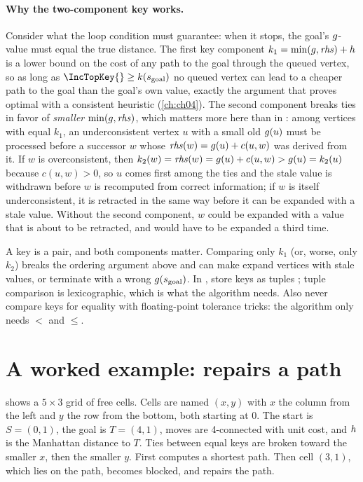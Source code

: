 \paragraph{Why the two-component key works.}
Consider what the loop condition must guarantee: when it stops, the goal's
$g$-value must equal the true distance. The first key component
$k_1 = \min(g,\mathit{rhs}) + h$ is a lower bound on the cost of any path to the goal
through the queued vertex, so as long as $\IncTopKey{} \ge k(s_{\mathrm{goal}})$ no
queued vertex can lead to a cheaper path to the goal than the goal's own value, exactly
the argument that proves \astar optimal with a consistent heuristic (\cref{ch:ch04}).
The second component breaks ties in favor of \emph{smaller} $\min(g,\mathit{rhs})$, which
matters more here than in \astar: among vertices with equal $k_1$, an underconsistent
vertex $u$ with a small old $g(u)$ must be processed before a successor $w$ whose
$\mathit{rhs}(w)=g(u)+c(u,w)$ was derived from it. If $w$ is overconsistent, then
$k_2(w)=\mathit{rhs}(w)=g(u)+c(u,w) > g(u) = k_2(u)$ because $c(u,w)>0$, so $u$ comes
first among the ties and the stale value is withdrawn before $w$ is recomputed from
correct information; if $w$ is itself underconsistent, it is retracted in the same way
before it can be expanded with a stale value. Without the second component, $w$ could be expanded with a
value that is about to be retracted, and would have to be expanded a third time.

\begin{pitfall}
A key is a pair, and both components matter. Comparing only $k_1$ (or, worse, only
$k_2$) breaks the ordering argument above and can make \lpastar expand vertices with
stale values, or terminate with a wrong $g(s_{\mathrm{goal}})$. In \python, store
keys as tuples ; tuple comparison is lexicographic, which is what the
algorithm needs. Also never compare keys for equality with floating-point tolerance
tricks: the algorithm only needs $<$ and $\le$.
\end{pitfall}

\FloatBarrier
\section{A worked example: \lpastar repairs a path}
\label{sec:ch05-lpastar-example}

\begin{example}
\label{ex:ch05-lpastar}
 shows a $5\times 3$ grid of free cells. Cells are named
$(x,y)$ with $x$ the column from the left and $y$ the row from the bottom, both starting
at $0$. The start is $S=(0,1)$, the goal is $T=(4,1)$, moves are 4-connected with unit
cost, and $h$ is the Manhattan distance to $T$. Ties between equal keys are broken
toward the smaller $x$, then the smaller $y$. First \lpastar computes a shortest path.
Then cell $(3,1)$, which lies on the path, becomes blocked, and \lpastar repairs the
path.
\end{example}

